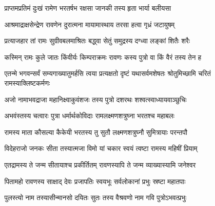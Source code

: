 
\translink{}

\storymeta

\resetShloka


\twolineshloka
{प्राप्तमप्रतिमं दुःखं रामेण भरतर्षभ}
{रक्षसा जानकी तस्य हृता भार्या बलीयसा}


\twolineshloka
{आश्रमाद्राक्षसेन्द्रेण रावणेन दुरात्मना}
{मायामास्थाय तरसा हत्वा गृध्रं जटायुषम्}


\twolineshloka
{प्रत्याजहार तां रामः सुग्रीवबलमाश्रितः}
{बद्ध्वा सेतुं समुद्रस्य दग्ध्वा लङ्कां शितैः शरैः}



\twolineshloka
{कस्मिन् रामः कुले जातः किंवीर्यः किम्पराक्रमः}
{रावणः कस्य पुत्रो वा किं वैरं तस्य तेन ह}


\threelineshloka
{एतन्मे भगवन्सर्वं सम्यगाख्यातुमर्हसि}
{त्वया प्रत्यक्षतो दृष्टं यथासर्वमशेषतः}
{श्रोतुमिच्छामि चरितं रामस्याक्लिष्टकर्मणः}



\twolineshloka
{अजो नामाभवद्राजा महानिक्ष्वाकुवंशजः}
{तस्य पुत्रो दशरथः शश्वत्स्वाध्यायवाञ्छुचिः}


\twolineshloka
{अभवंस्तस्य चत्वारः पुत्रा धर्मार्थकोविदाः}
{रामलक्ष्मणशत्रुघ्ना भरतश्च महाबलः}


\twolineshloka
{रामस्य माता कौसल्या कैकेयी भरतस्य तु}
{सुतौ लक्ष्मणशत्रुघ्नौ सुमित्रायाः परन्तपौ}


\twolineshloka
{विदेहराजो जनकः सीता तस्यात्मजा विमो}
{यां चकार स्वयं त्वष्टा रामस्य महिषीं प्रियाम्}


\twolineshloka
{एतद्रामस्य ते जन्म सीतायाश्च प्रकीर्तितम्}
{रावणस्यापि ते जन्म व्याख्यास्यामि जनेश्वर}


\twolineshloka
{पितामहो रावणस्य साक्षाद् देवः प्रजापतिः}
{स्वयभूः सर्वलोकानां प्रभुः स्रष्टा महातपाः}


\twolineshloka
{पुलस्त्यो नाम तस्यासीन्मानसो दयितः सुतः}
{तस्य वैश्रवणो नाम गवि पुत्रोऽभवत्प्रभुः}


